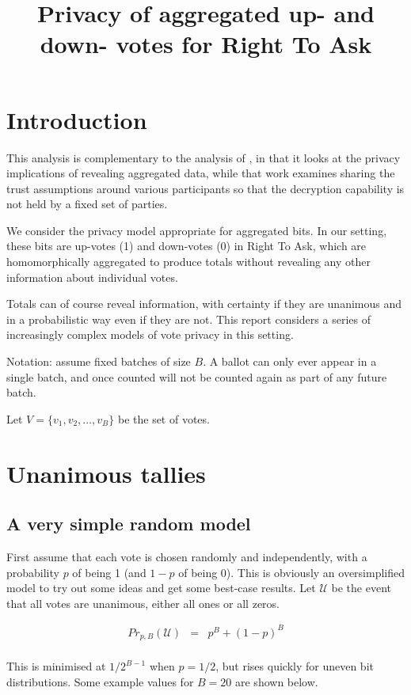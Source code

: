 \documentclass[10pt,a4paper]{article}
\newcommand{\prob}{\mathit{Pr}}
\newcommand{\U}{\mathcal{U}}
\begin{document}
	
	\title{Privacy of aggregated up- and down- votes for Right To Ask}

\section{Introduction}
This analysis is complementary to the analysis of \cite{kiayias2022privacy}, in that it looks at the privacy implications of revealing aggregated data, while that work examines sharing the trust assumptions around various participants so that the decryption capability is not held by a fixed set of parties.

We consider the privacy model appropriate for aggregated bits. In our setting, these bits are up-votes (1) and down-votes (0) in Right To Ask, which are homomorphically aggregated to produce totals without revealing any other information about individual votes.

Totals can of course reveal information, with certainty if they are unanimous and in a probabilistic way even if they are not. This report considers a series of increasingly complex models of vote privacy in this setting.

Notation: assume fixed batches of size $B$. A ballot can only ever appear in a single batch, and once counted will not be counted again as part of any future batch. 

Let $V = \{ v_1, v_2,\ldots,v_B\}$ be the set of votes.

\section{Unanimous tallies}

\subsection{A very simple random model}
First assume that each vote is chosen randomly and independently, with a probability $p$ of being 1 (and $1-p$ of being 0). This is obviously an oversimplified model to try out some ideas and get some best-case results.
Let $\U$ be the event that all votes are unanimous, either all ones or all zeros.

$$
\begin{array}{rcl}
	\prob_{p,B}(\U) & = & p^{B} + (1-p)^B \\
\end{array}
$$

This is minimised at $1/2^{B-1}$ when $p=1/2$, but rises quickly for uneven bit distributions. Some example values for $B=20$ are shown below.
\end{document}
